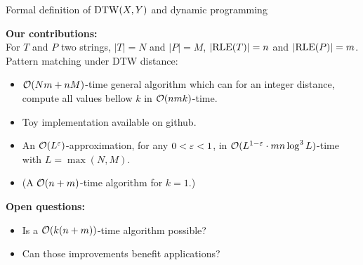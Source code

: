 \begin{frame}{Formal definition of $\mathrm{DTW}(X,Y)$ and dynamic programming}
  
\end{frame}
  

\begin{frame}{}

  \textbf{Our contributions:}\\
  For $T$ and $P$ two strings, $|T|=N$ and  $|P|=M$, $|\mathrm{RLE}(T)|=n$ and  $|\mathrm{RLE}(P)|=m$.
  Pattern matching under DTW distance:
  \begin{itemize}
  \item $\mathcal{O}(Nm+nM)$-time general algorithm which can for an integer distance, compute all values bellow $k$ in $\mathcal{O}(nmk)$-time. \pause
  \item Toy implementation available on github.\pause
  \item An $\mathcal{O}(L^{\varepsilon})$-approximation, for any $0 < \varepsilon < 1$, in  $\mathcal{O}(L^{1-\varepsilon} \cdot mn \log^3 L)$-time with $L=\max(N,M)$.\pause
  \item (A $\mathcal{O}(n+m)$-time algorithm for $k=1$.)\pause
  \end{itemize}
  
  
  \textbf{Open questions:}
  \begin{itemize}
  \item Is a $\mathcal{O}(k(n+m))$-time algorithm possible? \pause
  \item Can those improvements benefit applications?\pause
  \end{itemize}
  \end{frame}


